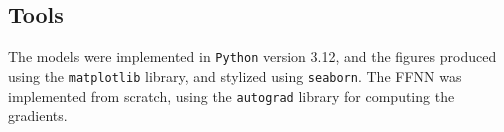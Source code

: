 \subsection{Tools}\label{ssec:tools}
The models were implemented in \verb|Python| version 3.12, and the figures produced using the \verb|matplotlib| library, 
and stylized using \verb|seaborn|. The FFNN was implemented from scratch, using the \verb|autograd| library \cite{maclaurin2015:autograd} 
for computing the gradients.
